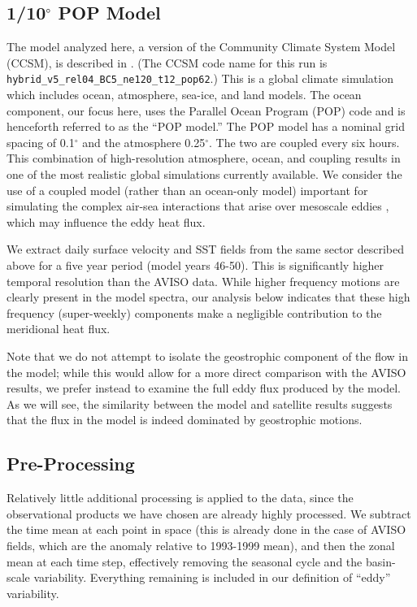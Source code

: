 \documentclass[10pt]{article}
\begin{document}
\subsection{1/10$^\circ$ POP Model}

The model analyzed here, a version of the Community Climate System Model (CCSM), is described in \citet{MccleanEtAl2011}.  (The CCSM code name for this run is {\tt 	hybrid\_v5\_rel04\_BC5\_ne120\_t12\_pop62}.) This is a global climate simulation which includes ocean, atmosphere, sea-ice, and land models. The ocean component, our focus here, uses the Parallel Ocean Program (POP) code and is henceforth referred to as the ``POP model.'' The POP model has a nominal grid spacing of 0.1$^\circ$ and the atmosphere 0.25$^\circ$. The two are coupled every six hours. This combination of high-resolution atmosphere, ocean, and coupling results in one of the most realistic global simulations currently available. We consider the use of a coupled model (rather than an ocean-only model) important for simulating the complex air-sea interactions that arise over mesoscale eddies \citep{SmallEtAl2008,BryanEtAl2010}, which may influence the eddy heat flux.

We extract daily surface velocity and SST fields from the same sector described above for a five year period (model years 46-50). This is significantly higher temporal resolution than the AVISO data. While higher frequency motions are clearly present in the model spectra, our analysis below indicates that these high frequency (super-weekly) components make a negligible contribution to the meridional heat flux.

Note that we do not attempt to isolate the geostrophic component of the flow in the model; while this would allow for a more direct comparison with the AVISO results, we prefer instead to examine the full eddy flux produced by the model. As we will see, the similarity between the model and satellite results suggests that the flux in the model is indeed dominated by geostrophic motions.

\subsection{Pre-Processing}

Relatively little additional processing is applied to the data, since the observational products we have chosen are already highly processed. We subtract the time mean at each point in space (this is already done in the case of AVISO fields, which are the anomaly relative to 1993-1999 mean), and then the zonal mean at each time step, effectively removing the seasonal cycle and the basin-scale variability. Everything remaining is included in our definition of ``eddy'' variability.
\end{document}
